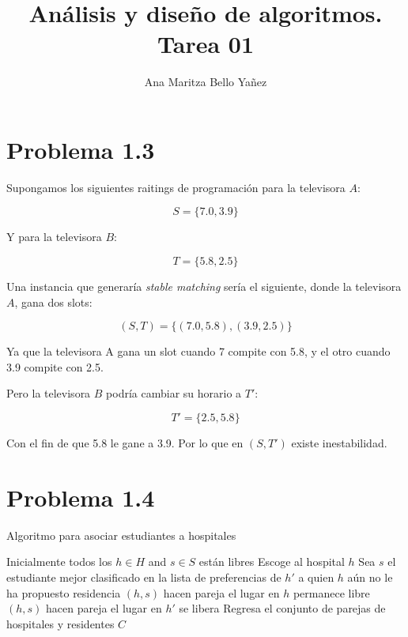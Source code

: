 \documentclass{article}
\begin{document}
\title{Análisis y diseño de algoritmos. \\ Tarea 01}
\author{Ana Maritza Bello Yañez}
\maketitle

\section*{Problema 1.3}
Supongamos los siguientes raitings de programación para la televisora $A$:

\begin{equation}
    S = \{7.0, 3.9\}
\end{equation}

Y para la televisora $B$:

\begin{equation}
    T = \{5.8, 2.5\}
\end{equation}

Una instancia que generaría \textit{stable matching} sería el siguiente, donde
la televisora $A$, gana dos slots:
 
\begin{equation}
    (S,T) = \{(7.0,5.8),(3.9,2.5)\}
\end{equation}

Ya que la televisora A gana un slot cuando 7 compite con 5.8, y el otro cuando
3.9 compite con 2.5.

Pero la televisora $B$ podría cambiar su horario a $T'$:

\begin{equation}
    T' = \{2.5, 5.8\}
\end{equation}

Con el fin de que 5.8 le gane a 3.9.
Por lo que en $(S,T')$ existe inestabilidad.

\section*{Problema 1.4}

\begin{algorithm}
\caption{Algoritmo para asociar estudiantes a hospitales}\label{alg:cap}
\begin{algorithmic}
\Require Inicialmente todos los $h \in H$ and $s \in S$ están libres
    \State Escoge al hospital $h$
    \State Sea $s$ el estudiante mejor clasificado en la lista de preferencias de $h'$ a quien $h$ aún no le ha propuesto residencia
        \State $(h,s)$ hacen pareja
            \State el lugar en $h$ permanece libre
            \State $(h,s)$ hacen pareja
            \State el lugar en $h'$ se libera
        \EndIf
    \EndIf
\EndWhile
\State Regresa el conjunto de parejas de hospitales y residentes $C$
\end{algorithmic}
\end{algorithm}
\end{document}
